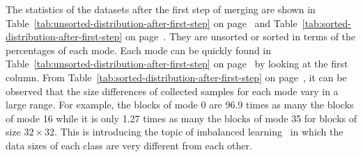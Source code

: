 The statistics of the datasets after the first step of merging are
shown in Table~\ref{tab:unsorted-distribution-after-first-step}
on page~\pageref{tab:unsorted-distribution-after-first-step} and 
Table~\ref{tab:sorted-distribution-after-first-step}
on page~\pageref{tab:sorted-distribution-after-first-step}.
They are unsorted or sorted in terms of the percentages
of each mode.
Each mode can be quickly found 
in Table~\ref{tab:unsorted-distribution-after-first-step}
on page~\pageref{tab:unsorted-distribution-after-first-step}
by looking at the first column.
From Table~\ref{tab:sorted-distribution-after-first-step}
on page~\pageref{tab:sorted-distribution-after-first-step},
it can be observed that the size differences of collected samples 
for each mode vary in a large range.
For example, the blocks of mode 0 are 96.9 times as many
the blocks of mode 16
while it is only 1.27 times as many the blocks of mode 35
for blocks of size \(32\times32\).
This is introducing the topic of imbalanced 
learning~\parencite{RN215} in which
the data sizes of each class are very different 
from each other.

